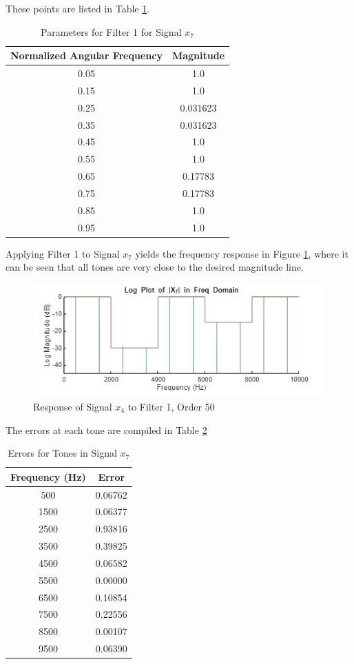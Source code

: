 These points are listed in Table \ref{tab:x7_filter1}.

\begin{table}[H]
    \centering
    \begin{tabular}{cc}
        Normalized Angular Frequency & Magnitude \\ \hline
        0.05 & 1.0\\
        0.15 & 1.0\\
        0.25 & 0.031623\\
        0.35 & 0.031623\\
        0.45 & 1.0\\
        0.55 & 1.0\\
        0.65 & 0.17783\\
        0.75 & 0.17783\\
        0.85 & 1.0\\
        0.95 & 1.0
    \end{tabular}
    \caption{Parameters for Filter 1 for Signal $x_7$}
    \label{tab:x7_filter1}
\end{table}

Applying Filter 1 to Signal $x_7$ yields the frequency response in Figure \ref{fig:x7_filtered}, where it can be seen that all tones are very close to the desired magnitude line.

\begin{figure}[H]
    \centering
    \includegraphics[width=0.5\linewidth]{figures/x7_postfilter.png}
    \caption{Response of Signal $x_4$ to Filter 1, Order 50}
    \label{fig:x7_filtered}
\end{figure}

The errors at each tone are compiled in Table \ref{tab:x7_errors}

\begin{table}[H]
    \centering
    \begin{tabular}{cc}
        Frequency (Hz) & Error \\ \hline
        500  & 0.06762\\
        1500 & 0.06377\\
        2500 & 0.93816\\
        3500 & 0.39825\\
        4500 & 0.06582\\
        5500 & 0.00000 \\
        6500 & 0.10854\\
        7500 & 0.22556\\
        8500 & 0.00107\\
        9500 & 0.06390
    \end{tabular}
    \caption{Errors for Tones in Signal $x_7$}
    \label{tab:x7_errors}
\end{table}


